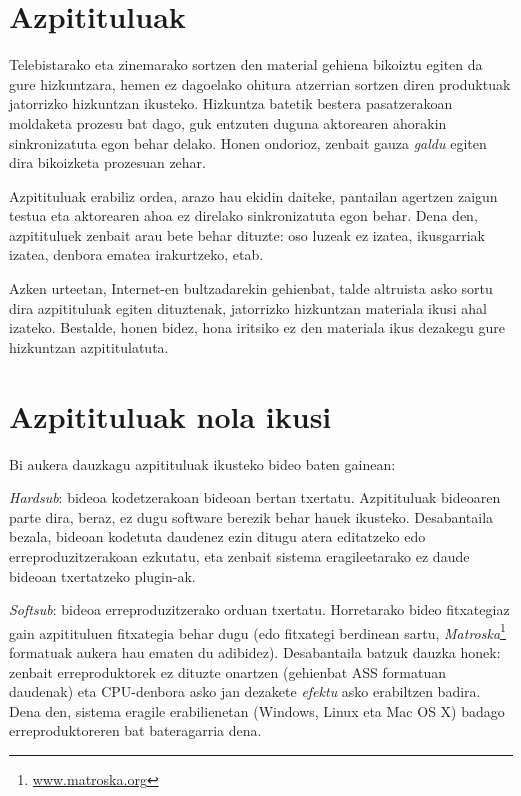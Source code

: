 \section{Azpitituluak}
Telebistarako eta zinemarako sortzen den material gehiena bikoiztu egiten da gure hizkuntzara, hemen ez dagoelako ohitura atzerrian sortzen diren produktuak jatorrizko hizkuntzan ikusteko. Hizkuntza batetik bestera pasatzerakoan moldaketa prozesu bat dago, guk entzuten duguna aktorearen ahorakin sinkronizatuta egon behar delako. Honen ondorioz, zenbait gauza \textit{galdu} egiten dira bikoizketa prozesuan zehar.

Azpitituluak erabiliz ordea, arazo hau ekidin daiteke, pantailan agertzen zaigun testua eta aktorearen ahoa ez direlako sinkronizatuta egon behar. Dena den, azpitituluek zenbait arau bete behar dituzte: oso luzeak ez izatea, ikusgarriak izatea, denbora ematea irakurtzeko, etab.

Azken urteetan, Internet-en bultzadarekin gehienbat, talde altruista asko sortu dira azpitituluak egiten dituztenak, jatorrizko hizkuntzan materiala ikusi ahal izateko. Bestalde, honen bidez, hona iritsiko ez den materiala ikus dezakegu gure hizkuntzan azpititulatuta.

\section{Azpitituluak nola ikusi}
Bi aukera dauzkagu azpitituluak ikusteko bideo baten gainean:

\textit{Hardsub}: bideoa kodetzerakoan bideoan bertan txertatu. Azpitituluak bideoaren parte dira, beraz, ez dugu software berezik behar hauek ikusteko. Desabantaila bezala, bideoan kodetuta daudenez ezin ditugu atera editatzeko edo erreproduzitzerakoan ezkutatu, eta zenbait sistema eragileetarako ez daude bideoan txertatzeko plugin-ak.

\textit{Softsub}: bideoa erreproduzitzerako orduan txertatu. Horretarako bideo fitxategiaz gain azpitituluen fitxategia behar dugu (edo fitxategi berdinean sartu, \textit{Matroska}\footnote{\url{www.matroska.org}} formatuak aukera hau ematen du adibidez). Desabantaila batzuk dauzka honek: zenbait erreproduktorek ez dituzte onartzen (gehienbat ASS formatuan daudenak) eta CPU-denbora asko jan dezakete \textit{efektu} asko erabiltzen badira. Dena den, sistema eragile erabilienetan (Windows, Linux eta Mac OS X) badago erreproduktoreren bat bateragarria dena.

